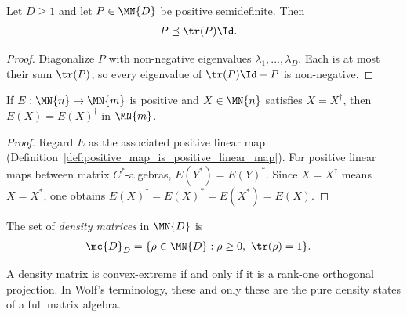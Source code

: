 \begin{theorem}
    \label{thm:psd_le_trace_smul_one}
    \leanok
    Let $D\geq 1$ and let $P\in\MN{D}$ be positive semidefinite. Then
    \begin{align}
        P
         & \preceq \tr(P)\Id.
        \label{eq:channel_psd_trace_bound}
    \end{align}
\end{theorem}

\begin{proof}\leanok
    Diagonalize $P$ with non-negative eigenvalues
    $\lambda_1,\ldots,\lambda_D$. Each is at most their sum $\tr(P)$, so
    every eigenvalue of $\tr(P)\Id-P$ is non-negative.
\end{proof}

\begin{theorem}
    \label{thm:positive_map_preserves_hermitian}
    \leanok
    If $E:\MN{n}\to\MN{m}$ is positive and
    $X\in\MN{n}$ satisfies $X = X^\dagger$, then
    $E(X) = E(X)^\dagger$ in $\MN{m}$.
\end{theorem}

\begin{proof}\leanok
    Regard $E$ as the associated positive linear map
    (Definition~\ref{def:positive_map_is_positive_linear_map}). For positive
    linear maps between matrix $C^*$-algebras, $E(Y^\ast)=E(Y)^\ast$.
    Since $X=X^\dagger$ means $X=X^\ast$, one obtains
    $E(X)^\dagger=E(X)^\ast=E(X^\ast)=E(X)$.
\end{proof}

\begin{definition}\label{def:density_matrices}
    \leanok
    The set of \emph{density matrices} in $\MN{D}$ is
    \begin{align}
        \mc{D}_D
         & =\{\rho \in \MN{D} : \rho \ge 0,\ \tr(\rho) = 1\}.
        \label{eq:channel_density_matrices}
    \end{align}
\end{definition}

\begin{theorem}
    \label{thm:extreme_density_matrices}
    \leanok
    A density matrix is convex-extreme if and only if it is a rank-one
    orthogonal projection. In Wolf's terminology, these and only these are
    the pure density states of a full matrix algebra.
\end{theorem}

